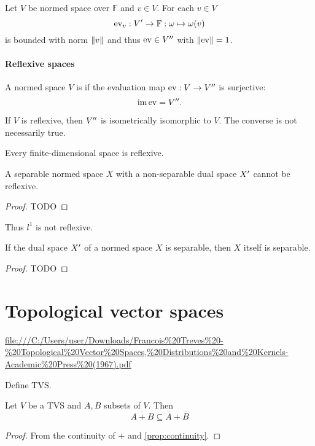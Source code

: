 \begin{lemma}
Let $V$ be normed space over $\mathbb{F}$ and $v\in V$. For each $v\in V$
\[ \operatorname{ev}_v: {V}^\prime \to \mathbb{F}: \omega \mapsto \omega(v) \]
is bounded with norm $\lVert v\rVert$ and thus $\operatorname{ev}\in {V}^{\prime\prime}$ with $\lVert\operatorname{ev}\rVert = 1$.
\end{lemma}

\subsubsection{Reflexive spaces}
\begin{definition}
A normed space $V$ is  if the evaluation map $\operatorname{ev}:V\to {V}^{\prime\prime}$ is surjective:
\[ \operatorname{im}\operatorname{ev} = {V}^{\prime\prime}. \]
\end{definition}
If $V$ is reflexive, then ${V}^{\prime\prime}$ is isometrically isomorphic to $V$. The converse is not necessarily true.

\begin{lemma}
Every finite-dimensional space is reflexive.
\end{lemma}

\begin{proposition}
A separable normed space $X$ with a non-separable dual space ${X}^\prime$ cannot be reflexive. 
\end{proposition}
\begin{proof}
TODO
\end{proof}
Thus $l^1$ is not reflexive.

\begin{proposition}
If the dual space ${X}^\prime$ of a  normed space $X$ is separable, then $X$ itself is separable. 
\end{proposition}
\begin{proof}
TODO
\end{proof}








\chapter{Topological vector spaces}
\url{file:///C:/Users/user/Downloads/Francois%20Treves%20-%20Topological%20Vector%20Spaces,%20Distributions%20and%20Kernels-Academic%20Press%20(1967).pdf}

Define TVS.

\begin{lemma} \label{lemma:closureSum}
Let $V$ be a TVS and $A,B$ subsets of $V$. Then
\[ \overline{A+B} \subseteq \overline{A} + \overline{B} \]
\end{lemma}
\begin{proof}
From the continuity of $+$ and \ref{prop:continuity}.
\end{proof}

